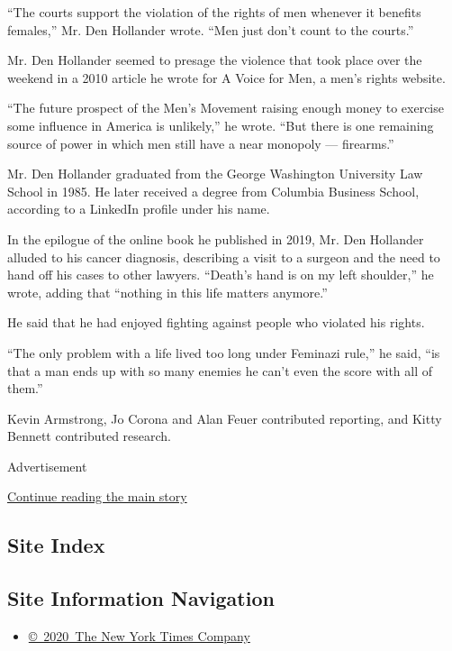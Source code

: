 ``The courts support the violation of the rights of men whenever it
benefits females,'' Mr. Den Hollander wrote. ``Men just don't count to
the courts.''

Mr. Den Hollander seemed to presage the violence that took place over
the weekend in a 2010 article he wrote for A Voice for Men, a men's
rights website.

``The future prospect of the Men's Movement raising enough money to
exercise some influence in America is unlikely,'' he wrote. ``But there
is one remaining source of power in which men still have a near monopoly
--- firearms.''

Mr. Den Hollander graduated from the George Washington University Law
School in 1985. He later received a degree from Columbia Business
School, according to a LinkedIn profile under his name.

In the epilogue of the online book he published in 2019, Mr. Den
Hollander alluded to his cancer diagnosis, describing a visit to a
surgeon and the need to hand off his cases to other lawyers. ``Death's
hand is on my left shoulder,'' he wrote, adding that ``nothing in this
life matters anymore.''

He said that he had enjoyed fighting against people who violated his
rights.

``The only problem with a life lived too long under Feminazi rule,'' he
said, ``is that a man ends up with so many enemies he can't even the
score with all of them.''

Kevin Armstrong, Jo Corona and Alan Feuer contributed reporting, and
Kitty Bennett contributed research.

Advertisement

\protect\hyperlink{after-bottom}{Continue reading the main story}

\hypertarget{site-index}{%
\subsection{Site Index}\label{site-index}}

\hypertarget{site-information-navigation}{%
\subsection{Site Information
Navigation}\label{site-information-navigation}}

\begin{itemize}
\tightlist
\item
  \href{https://help.nytimes.com/hc/en-us/articles/115014792127-Copyright-notice}{©~2020~The
  New York Times Company}
\end{itemize}

